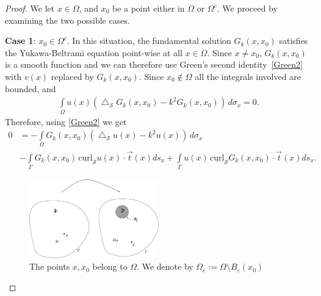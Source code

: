 \documentclass[final]{siamltex}
\newcommand{\lap}{\bigtriangleup}
\renewcommand{\S} {\mathcal{S}}
\begin{document}
\begin{proof} We let $x\in \Omega$, and $x_0$ be a point either in $\Omega$ or $\Omega^c$. 
We proceed by examining the two possible cases.

{\bf Case 1}:  $x_{0} \in \Omega^{c}$.  In this situation, the
fundamental solution $G_{k}(x,x_{0})$ satisfies the Yukawa-Beltrami
equation point-wise at all $x\in \Omega$. Since $x \neq x_0$,
$G_{k}(x,x_0)$ is a smooth function and we can therefore use Green's
second identity~\eqref{Green2} with $v(x)$ replaced by
$G_{k}(x,x_{0})$. Since $x_0\not \in \Omega$ all the
integrals involved are bounded, and 
\begin{align*}
  \int\limits_{\Omega} u(x)(\lap_{\S}G_{k}(x,x_0) 
      -k^{2}G_{k}(x,x_0)) \, d\sigma_x=0.
\end{align*}
Therefore, using \eqref{Green2} we get 
\begin{align*}
 0 &= - \int\limits_{\Omega}
    G_k(x,x_{0})\left(\lap_{\S}u(x) -k^2 u(x)\right)\,d\sigma_x \\
    &-\int\limits_{{\Gamma}} G_k(x,x_{0}) \, \underline{\mbox{curl}}_{\S}
    u(x) \cdot \vec{t}(x) ds_{x} 
 + \int\limits_{{\Gamma}}  u(x)
 \,\underline{\mbox{curl}}_{{\S}} G_k(x,x_0) \cdot \vec{t}(x) ds_{x}.
\end{align*}
\begin{figure}
  \centering
  \includegraphics[width=0.5\textwidth]{proof1}
  \caption{\label{f:proof1} The points $x,x_0$ belong to $\Omega$. We
  denote by $\Omega_\varepsilon:=\Omega\setminus B_{\varepsilon}(x_0)$}
\end{figure}


\end{proof}
\end{document}
